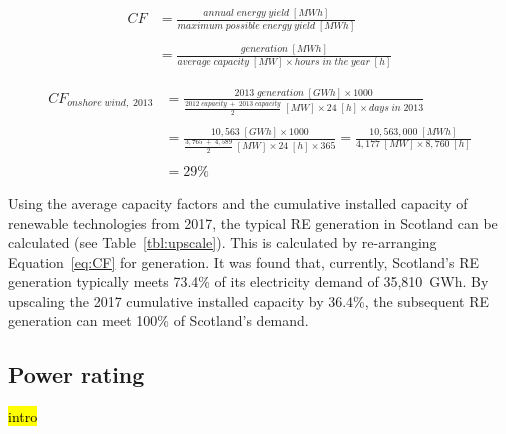 







	\begin{equation}\label{eq:CF}
		\begin{split}
			CF & = \frac{annual\;energy\;yield\;[MWh]}{maximum\;possible\;energy\;yield\;[MWh]} \\
			& \\
			& = \frac{generation\;[MWh]}{average\;capacity\;[MW] \times hours\;in\;the\;year\;[h]}
		\end{split}
	\end{equation}

	\begin{equation}\label{eq:CF_example}
		\begin{split}
			CF_{onshore\;wind,\;2013} & = \frac{2013\;generation\;[GWh] \times 1000}{\frac{2012\;capacity\;+\;2013\;capacity}{2}\;[MW] \times 24\;[h] \times days\;in\;2013} \\
			& \\
			& = \frac{10,563\;[GWh] \times 1000}{\frac{3,765\;+\;4,589}{2}\;[MW] \times 24\;[h] \times 365} = \frac{10,563,000\;[MWh]}{4,177\;[MW] \times 8,760\;[h]} \\
			& \\
			& = 29\%
		\end{split}
	\end{equation}

Using the average capacity factors and the cumulative installed capacity of renewable technologies from 2017, the typical RE generation in Scotland can be calculated (see Table~\ref{tbl:upscale}).
This is calculated by re-arranging Equation~\ref{eq:CF} for generation.
It was found that, currently, Scotland's RE generation typically meets 73.4\% of its electricity demand of 35,810~GWh.
By upscaling the 2017 cumulative installed capacity by 36.4\%, the subsequent RE generation can meet 100\% of Scotland's demand.






\subsection{Power rating}

\hl{intro}




